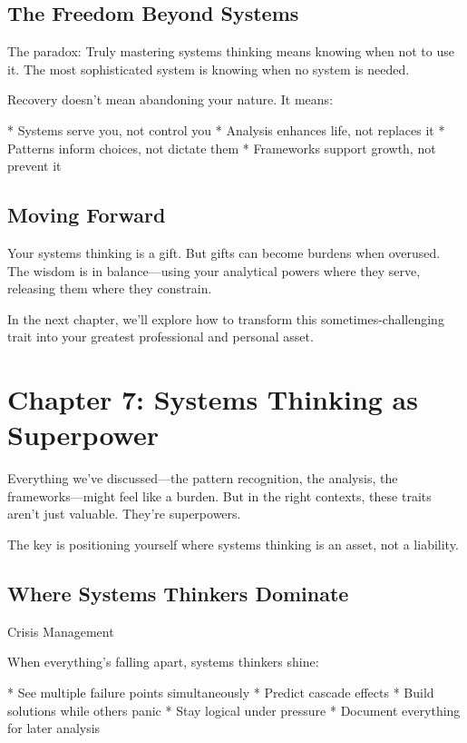 \documentclass[12pt,oneside]{book}
\begin{document}
\section{The Freedom Beyond Systems}

The paradox: Truly mastering systems thinking means knowing when not to use it. The most sophisticated system is knowing when no system is needed.

Recovery doesn't mean abandoning your nature. It means:

                    * Systems serve you, not control you
                    * Analysis enhances life, not replaces it
                    * Patterns inform choices, not dictate them
                    * Frameworks support growth, not prevent it

\section{Moving Forward}

Your systems thinking is a gift. But gifts can become burdens when overused. The wisdom is in balance---using your analytical powers where they serve, releasing them where they constrain.

In the next chapter, we'll explore how to transform this sometimes-challenging trait into your greatest professional and personal asset.

\chapter{Chapter 7: Systems Thinking as Superpower}

Everything we've discussed---the pattern recognition, the analysis, the frameworks---might feel like a burden. But in the right contexts, these traits aren't just valuable. They're superpowers.

The key is positioning yourself where systems thinking is an asset, not a liability.

\section{Where Systems Thinkers Dominate}

                Crisis Management
                
When everything's falling apart, systems thinkers shine:

                    * See multiple failure points simultaneously
                    * Predict cascade effects
                    * Build solutions while others panic
                    * Stay logical under pressure
                    * Document everything for later analysis
\end{document}
